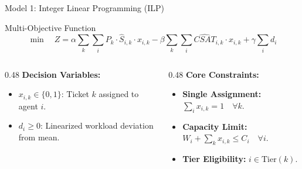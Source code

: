 \documentclass[10pt,aspectratio=169]{beamer}
\begin{document}
\begin{frame}{Model 1: Integer Linear Programming (ILP)}
    \begin{block}{Multi-Objective Function}
        \[
        \min \quad Z = \alpha \sum_{k} \sum_{i} P_k \cdot \widehat{S}_{i,k} \cdot x_{i,k} 
        - \beta \sum_{k} \sum_{i} \widehat{CSAT}_{i,k} \cdot x_{i,k} 
        + \gamma \sum_{i} d_i
        \]
    \end{block}
    \vspace{0.3cm}
    \begin{columns}[T]
        \begin{column}{0.48\textwidth}
            \textbf{Decision Variables:}
            \begin{itemize}
                \item $x_{i,k} \in \{0, 1\}$: Ticket $k$ assigned to agent $i$.
                \item $d_i \ge 0$: Linearized workload deviation from mean.
            \end{itemize}
        \end{column}
        \begin{column}{0.48\textwidth}
            \textbf{Core Constraints:}
            \begin{itemize}
                \item \textbf{Single Assignment:} $\sum_{i} x_{i,k} = 1 \quad \forall k$.
                \item \textbf{Capacity Limit:} $W_i + \sum_{k} x_{i,k} \le C_i \quad \forall i$.
                \item \textbf{Tier Eligibility:} $i \in \text{Tier}(k)$.
            \end{itemize}
        \end{column}
    \end{columns}
\end{frame}
\end{document}
